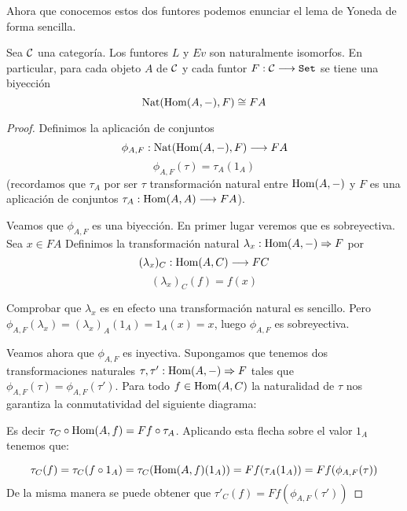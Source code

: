 Ahora que conocemos estos dos funtores podemos enunciar el lema
de Yoneda de forma sencilla.

\begin{theorem}
  Sea $\mathcal{C}$ una categoría. Los funtores $L$ y $Ev$ son naturalmente isomorfos.
  En particular, para cada objeto $A$ de $\mathcal{C}$ y cada funtor $F : \mathcal{C}\longrightarrow \texttt{Set}$
  se tiene una biyección
  $$\operatorname{Nat}(\operatorname{Hom}(A, -), F) \cong FA$$
\end{theorem}
\begin{proof}
  Definimos la aplicación de conjuntos
  $$\phi_{A, F} : \operatorname{Nat}(\operatorname{Hom}(A, -), F)\longrightarrow FA$$
  $$\phi_{A, F}(\tau) = \tau_A (1_A)$$
  (recordamos que $\tau_A$ por ser $\tau$ transformación natural entre $\operatorname{Hom}(A, -)$ y $F$ es
  una aplicación de conjuntos $\tau_A : \operatorname{Hom}(A, A)\longrightarrow F A$).

  Veamos que $\phi_{A, F}$ es una biyección. En primer lugar veremos que es sobreyectiva. Sea $x \in FA$
  Definimos la transformación natural $\lambda_x : \operatorname{Hom}(A, -)\Rightarrow F$ por
  $$(\lambda_x)_C : \operatorname{Hom}(A, C)\longrightarrow F C$$
  $$(\lambda_x)_C(f) = f(x)$$

  Comprobar que $\lambda_x$ es en efecto una transformación natural es sencillo. Pero
  $\phi_{A, F}(\lambda_x) = (\lambda_x)_A (1_A) = 1_A(x) = x$, luego $\phi_{A, F}$
  es sobreyectiva.

  Veamos ahora que $\phi_{A, F}$ es inyectiva. Supongamos que tenemos
  dos transformaciones naturales $\tau, \tau' : \operatorname{Hom}(A, -)\Rightarrow F$
  tales que $\phi_{A, F}(\tau) = \phi_{A, F}(\tau')$. Para todo $f \in \operatorname{Hom}(A, C)$
  la naturalidad de $\tau$ nos garantiza la conmutatividad
  del siguiente diagrama:

  \begin{center}
  \end{center}


  Es decir $\tau_C \circ \operatorname{Hom}(A, f) = F f \circ \tau_A$. Aplicando
  esta flecha sobre el valor $1_A$ tenemos que:

  $$\tau_C(f) = \tau_C(f \circ 1_A) = \tau_C(\operatorname{Hom}(A, f)(1_A)) = F f(\tau_A(1_A)) = Ff(\phi_{A, F}(\tau))$$
  De la misma manera se puede obtener que $\tau'_C(f)  = Ff(\phi_{A, F}(\tau'))$


\end{proof}
